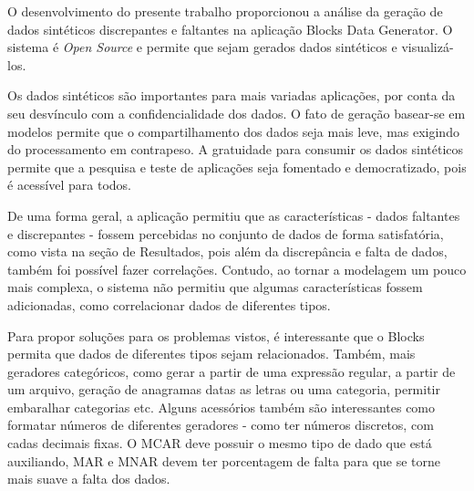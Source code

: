 \documentclass[
	12pt,				%
	openright,			%
	twoside,			%
	a4paper,			%
	english,			%
	brazil				%
	]{abntex2}
\begin{document}
O desenvolvimento do presente trabalho proporcionou a análise da geração de dados sintéticos discrepantes e faltantes na aplicação Blocks Data Generator.
O sistema é \emph{Open Source} e permite que sejam gerados dados sintéticos e visualizá-los.
\par
Os dados sintéticos são importantes para mais variadas aplicações, por conta da seu desvínculo com a confidencialidade dos dados.
O fato de geração basear-se em modelos permite que o compartilhamento dos dados seja mais leve, mas exigindo do processamento em contrapeso.
A gratuidade para consumir os dados sintéticos permite que a pesquisa e teste de aplicações seja fomentado e democratizado, pois é acessível para todos.
\par
De uma forma geral, a aplicação permitiu que as características - dados faltantes e discrepantes - fossem percebidas no conjunto de dados de forma satisfatória, como vista na seção de Resultados, pois além da discrepância e falta de dados, também foi possível fazer correlações.
Contudo, ao tornar a modelagem um pouco mais complexa, o sistema não permitiu que algumas características fossem adicionadas, como correlacionar dados de diferentes tipos.
\par
Para propor soluções para os problemas vistos, é interessante que o Blocks permita que dados de diferentes tipos sejam relacionados.
Também, mais geradores categóricos, como gerar a partir de uma expressão regular, a partir de um arquivo, geração de anagramas datas as letras ou uma categoria, permitir embaralhar categorias etc.
Alguns acessórios também são interessantes como formatar números de diferentes geradores - como ter números discretos, com cadas decimais fixas.
O MCAR deve possuir o mesmo tipo de dado que está auxiliando, MAR e MNAR devem ter porcentagem de falta para que se torne mais suave a falta dos dados.
\par

\lipsum[31-33]

\postextual


\end{document}
